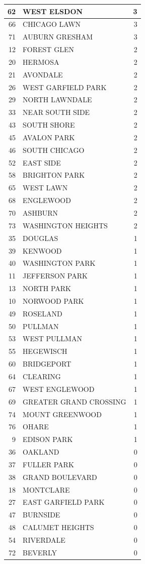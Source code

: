 \documentclass[
]{article}
\begin{document}
\begin{table}
\begin{tabular}[t]{r|l|r}
\hline
62 & WEST ELSDON & 3\\
\hline
66 & CHICAGO LAWN & 3\\
\hline
71 & AUBURN GRESHAM & 3\\
\hline
12 & FOREST GLEN & 2\\
\hline
20 & HERMOSA & 2\\
\hline
21 & AVONDALE & 2\\
\hline
26 & WEST GARFIELD PARK & 2\\
\hline
29 & NORTH LAWNDALE & 2\\
\hline
33 & NEAR SOUTH SIDE & 2\\
\hline
43 & SOUTH SHORE & 2\\
\hline
45 & AVALON PARK & 2\\
\hline
46 & SOUTH CHICAGO & 2\\
\hline
52 & EAST SIDE & 2\\
\hline
58 & BRIGHTON PARK & 2\\
\hline
65 & WEST LAWN & 2\\
\hline
68 & ENGLEWOOD & 2\\
\hline
70 & ASHBURN & 2\\
\hline
73 & WASHINGTON HEIGHTS & 2\\
\hline
35 & DOUGLAS & 1\\
\hline
39 & KENWOOD & 1\\
\hline
40 & WASHINGTON PARK & 1\\
\hline
11 & JEFFERSON PARK & 1\\
\hline
13 & NORTH PARK & 1\\
\hline
10 & NORWOOD PARK & 1\\
\hline
49 & ROSELAND & 1\\
\hline
50 & PULLMAN & 1\\
\hline
53 & WEST PULLMAN & 1\\
\hline
55 & HEGEWISCH & 1\\
\hline
60 & BRIDGEPORT & 1\\
\hline
64 & CLEARING & 1\\
\hline
67 & WEST ENGLEWOOD & 1\\
\hline
69 & GREATER GRAND CROSSING & 1\\
\hline
74 & MOUNT GREENWOOD & 1\\
\hline
76 & OHARE & 1\\
\hline
9 & EDISON PARK & 1\\
\hline
36 & OAKLAND & 0\\
\hline
37 & FULLER PARK & 0\\
\hline
38 & GRAND BOULEVARD & 0\\
\hline
18 & MONTCLARE & 0\\
\hline
27 & EAST GARFIELD PARK & 0\\
\hline
47 & BURNSIDE & 0\\
\hline
48 & CALUMET HEIGHTS & 0\\
\hline
54 & RIVERDALE & 0\\
\hline
72 & BEVERLY & 0\\
\hline
\end{tabular}
\end{table}
\end{document}
